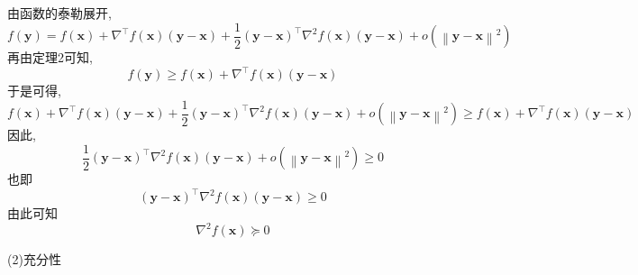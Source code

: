 由函数的泰勒展开,
$$
f\left( \boldsymbol{y} \right) =f\left( \boldsymbol{x} \right) +\nabla ^{\top}f\left( \boldsymbol{x} \right) \left( \boldsymbol{y}-\boldsymbol{x} \right) +\frac{1}{2}\left( \boldsymbol{y}-\boldsymbol{x} \right) ^{\top}\nabla ^2f\left( \boldsymbol{x} \right) \left( \boldsymbol{y}-\boldsymbol{x} \right) +o\left( \left\| \boldsymbol{y}-\boldsymbol{x} \right\| ^2 \right)~
$$
再由定理2可知,
$$
f\left( \boldsymbol{y} \right) \geqslant f\left( \boldsymbol{x} \right) +\nabla ^{\top}f\left( \boldsymbol{x} \right) \left( \boldsymbol{y}-\boldsymbol{x} \right)~
$$
于是可得,
$$
f\left( \boldsymbol{x} \right) +\nabla ^{\top}f\left( \boldsymbol{x} \right) \left( \boldsymbol{y}-\boldsymbol{x} \right) +\frac{1}{2}\left( \boldsymbol{y}-\boldsymbol{x} \right) ^{\top}\nabla ^2f\left( \boldsymbol{x} \right) \left( \boldsymbol{y}-\boldsymbol{x} \right) +o\left( \left\| \boldsymbol{y}-\boldsymbol{x} \right\| ^2 \right) \geqslant f\left( \boldsymbol{x} \right) +\nabla ^{\top}f\left( \boldsymbol{x} \right) \left( \boldsymbol{y}-\boldsymbol{x} \right)~
$$
因此,
$$
\frac{1}{2}\left( \boldsymbol{y}-\boldsymbol{x} \right) ^{\top}\nabla ^2f\left( \boldsymbol{x} \right) \left( \boldsymbol{y}-\boldsymbol{x} \right) +o\left( \left\| \boldsymbol{y}-\boldsymbol{x} \right\| ^2 \right) \geqslant 0~
$$
也即
$$
\left( \boldsymbol{y}-\boldsymbol{x} \right) ^{\top}\nabla ^2f\left( \boldsymbol{x} \right) \left( \boldsymbol{y}-\boldsymbol{x} \right) \geqslant 0~
$$
由此可知
$$
\nabla ^2f\left( \boldsymbol{x} \right) \succeq 0~
$$

(2)充分性

